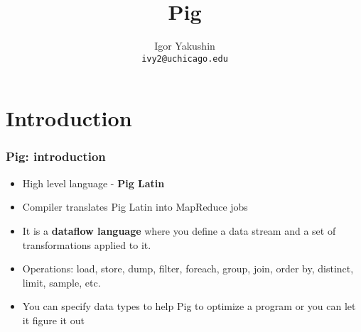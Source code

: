 \documentclass{beamer}
\title{\huge{Pig}}
\author{Igor Yakushin \\ \texttt{ivy2@uchicago.edu}}
\date{}
\begin{document}



\begin{frame}
\titlepage
\end{frame}

\section{Introduction}
\begin{frame}[fragile]
 \frametitle{Pig: introduction}
 \begin{itemize}
  \item High level language - {\color{mycolordef}\textbf{Pig Latin}}
  \item Compiler translates Pig Latin into MapReduce jobs
  \item It is a {\color{mycolordef}\textbf{dataflow language}} where you define a data stream and a set of transformations applied to it.
  \item Operations: load, store, dump, filter, foreach, group, join, order by, distinct, limit, sample, etc.
  \item You can specify data types to help Pig to optimize a program or you can let it figure it out
 \end{itemize}
\end{frame}
\end{document}
